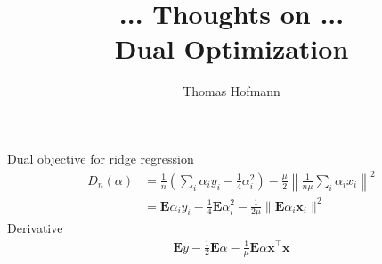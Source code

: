 \documentclass{article}
\title{{\large ... Thoughts on ...} \\ Dual Optimization}
\author{Thomas Hofmann}
\newcommand{\E}{{\mathbf E}}
\newcommand{\x}{{\mathbf x}}
\newcommand{\y}{{\mathbf y}}
\begin{document}
\maketitle

Dual objective for ridge regression
\begin{align}
D_n(\alpha) & = \frac 1n \left( \sum_i \alpha_i y_i  -\frac 14 \alpha_i^2 \right) - \frac \mu 2 \left\| \frac 1{n \mu} \sum_i \alpha_i x_i \right\|^2 
\\
& = \E \alpha_i y_i - \frac 14 \E\alpha_i^2 - \frac{1}{2\mu} \| \E \alpha_i \x_i \|^2
\end{align}
Derivative
\begin{align}
\E y - \frac 12 \E \alpha - \frac{1}{\mu}  \E \alpha \x^\top \x
\end{align}





\end{document}
